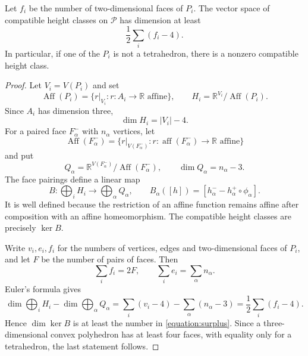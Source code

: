\documentclass[10pt,a4paper]{amsart}
\newcommand{\Aff}{\operatorname{Aff}}
\newcommand{\R}{\mathbb R}
\begin{document}
\begin{lemma}\label{lemma:surplus}
Let $f_i$ be the number of two-dimensional faces of $P_i$. The vector space of compatible height classes on $\mathcal P$ has dimension at least
\begin{equation}\label{equation:surplus}
\frac12\sum_i(f_i-4).
\end{equation}
In particular, if one of the $P_i$ is not a tetrahedron, there is a nonzero compatible height class.
\end{lemma}

\begin{proof}
Let $V_i=V(P_i)$ and set
\begin{equation}
\Aff(P_i)=\{r|_{V_i}:r:A_i\to\R\text{ affine}\},
\qquad
H_i=\R^{V_i}/\Aff(P_i).
  \nonumber \end{equation}
Since $A_i$ has dimension three,
\begin{equation}
\dim H_i=|V_i|-4.
  \nonumber \end{equation}
For a paired face $F^-_\alpha$ with $n_\alpha$ vertices, let
\begin{equation}
\Aff(F^-_\alpha)=\{r|_{V(F^-_\alpha)}:r:\operatorname{aff}(F^-_\alpha)\to\R\text{ affine}\}
  \nonumber \end{equation}
and put
\begin{equation}
Q_\alpha=\R^{V(F^-_\alpha)}/\Aff(F^-_\alpha),
\qquad
\dim Q_\alpha=n_\alpha-3.
  \nonumber \end{equation}
The face pairings define a linear map
\begin{equation}
B:\bigoplus_i H_i\longrightarrow\bigoplus_\alpha Q_\alpha,
\qquad
B_\alpha([h])=[h^-_\alpha-h^+_\alpha\circ\phi_\alpha].
  \nonumber \end{equation}
It is well defined because the restriction of an affine function remains affine after composition with an affine homeomorphism. The compatible height classes are precisely $\ker B$.

Write $v_i,e_i,f_i$ for the numbers of vertices, edges and two-dimensional faces of $P_i$, and let $F$ be the number of pairs of faces. Then
\begin{equation}
\sum_i f_i=2F,
\qquad
\sum_i e_i=\sum_\alpha n_\alpha.
  \nonumber \end{equation}
Euler's formula gives
\begin{equation}
\dim\bigoplus_iH_i-\dim\bigoplus_\alpha Q_\alpha
 =\sum_i(v_i-4)-\sum_\alpha(n_\alpha-3)
 =\frac12\sum_i(f_i-4).
  \nonumber \end{equation}
Hence $\dim\ker B$ is at least the number in \eqref{equation:surplus}. Since a three-dimensional convex polyhedron has at least four faces, with equality only for a tetrahedron, the last statement follows.
\end{proof}
\end{document}
